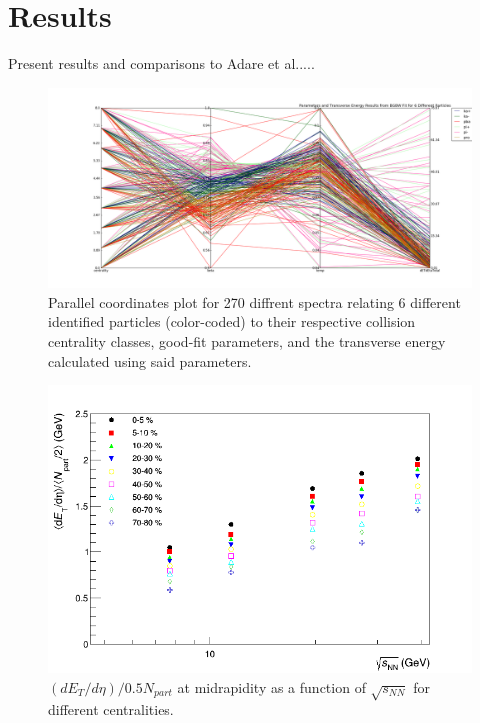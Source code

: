 \chapter{Results} \label{ch:results}
Present results and comparisons to Adare et al.....

	\begin{figure}[h]
	  \centering
	  \includegraphics[width=6.5in]{figures/parallelCoordPlot_4Axes.png}
	  \caption{Parallel coordinates plot for 270 diffrent spectra relating 6 different identified particles (color-coded) to their respective collision centrality classes, good-fit parameters, and the transverse energy calculated using said parameters.}\label{fig:parallelCoord}
	\end{figure}

	\begin{figure}[h]
	  \centering
	  \includegraphics[width=5.5in]{figures/finalStacked/dETdEtaOverNpartBy2SumCent8s.png}
	  \caption{$(dE_{T}/d\eta)/0.5N_{part}$ at midrapidity as a function of $\sqrt{s_{NN}}$ for different centralities.}\label{fig:dETdEtaOverNpartBy2SumCents}
	\end{figure}
	

